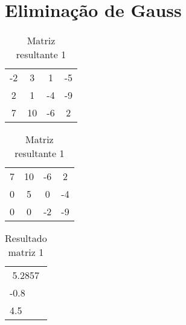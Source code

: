 \documentclass[12pt]{article}
\begin{document}
\section{Eliminação de Gauss}
\begin{table}[htb]
  \begin{minipage}[b]{.46\linewidth}

    \centering
    \begin{tabular}{|c c c|c|}
        -2           &          3           &          1      &   -5 \\
        2           &          1           &          -4      &   -9 \\
        7           &          10           &          -6     &   2 \\
    \end{tabular}
    \caption{Matriz de entrada 1}
    \label{tab:esq}

  \end{minipage}\hfill
  \begin{minipage}[b]{.46\linewidth}

    \centering
    \begin{tabular}{|c c c|c|}
        7           &          10           &          -6      &   2 \\
        0           &          5           &          0      &   -4 \\
        0           &          0           &          -2     &   -9 \\
    \end{tabular}
    \caption{Matriz resultante 1}
    \label{tab:dir}
  \end{minipage}
\end{table}


\begin{table}[!h]
\centering
\begin{tabular}{|l|}
\multicolumn{1}{|c|}{5.2857} \\
-0.8                         \\
4.5                         
\end{tabular}
\caption{Resultado matriz 1}
\end{table}

\end{document}
